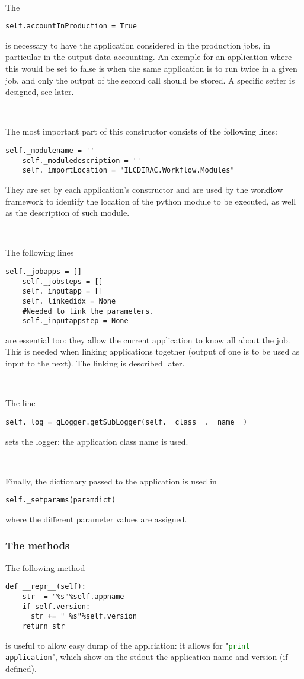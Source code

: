 \documentclass[a4paper,12pt]{article}
\begin{document}
~

The 
\begin{lstlisting}[firstnumber=71]
    self.accountInProduction = True    
\end{lstlisting}
is necessary to have the application considered in the production jobs, in
particular in the output data accounting. An exemple for an application where
this would be set to false is when the same application is to run twice in a
given job, and only the output of the second call should be stored. A specific
setter is designed, see later.

~

The most important part of this constructor consists of the following lines:
\begin{lstlisting}[firstnumber=73]
    self._modulename = ''
    self._moduledescription = ''
    self._importLocation = "ILCDIRAC.Workflow.Modules" 
\end{lstlisting}
They are set by each application's constructor and are used by the workflow
framework to identify the location of the python module to be executed, as well
as the description of such module. 

~

The following lines
\begin{lstlisting}[firstnumber=81]
    self._jobapps = []
    self._jobsteps = []
    self._inputapp = []
    self._linkedidx = None
    #Needed to link the parameters.
    self._inputappstep = None
\end{lstlisting}
are essential too: they allow the current application to know all about the job.
This is needed when linking applications together (output of one is to be used
as input to the next). The linking is described later.

~

The line
\begin{lstlisting}[firstnumber=93]
    self._log = gLogger.getSubLogger(self.__class__.__name__)
\end{lstlisting}
sets the logger: the application class name is used.

~

Finally, the dictionary passed to the application is used in
\begin{lstlisting}[firstnumber=97]
    self._setparams(paramdict)
\end{lstlisting}
where the different parameter values are assigned. 

\subsubsection{The methods}
The following method
\begin{lstlisting}[firstnumber=99]
  def __repr__(self):
    str  = "%s"%self.appname
    if self.version:
      str += " %s"%self.version
    return str
\end{lstlisting}
is useful to allow easy dump of the applciation: it allows for 
"\lstinline[language=python]!print application!", 
which show on the stdout the application name and version (if defined).
\end{document}
